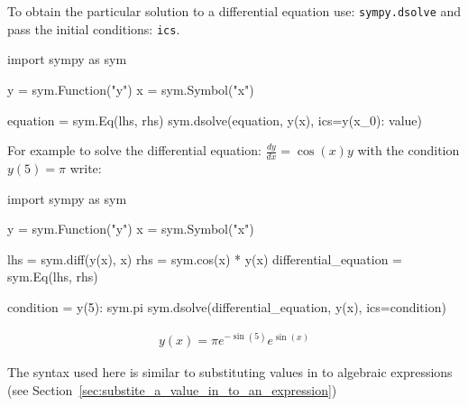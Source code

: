 To obtain the particular solution to a differential equation use:
\texttt{sympy.dsolve} and pass the initial conditions: \texttt{ics}.


\begin{pyin}
import sympy as sym

y = sym.Function("y")
x = sym.Symbol("x")

equation = sym.Eq(lhs, rhs)
sym.dsolve(equation, y(x), ics={y(x_0): value})
\end{pyin}



For example to solve the differential equation: \(\frac{dy}{dx} = \cos(x) y\)
with the condition \(y(5)= \pi\) 
write:




\begin{pyin}
import sympy as sym

y = sym.Function("y")
x = sym.Symbol("x")

lhs = sym.diff(y(x), x)
rhs = sym.cos(x) * y(x)
differential_equation = sym.Eq(lhs, rhs)

condition = {y(5): sym.pi}
sym.dsolve(differential_equation, y(x), ics=condition)
\end{pyin}




\begin{equation*}
\begin{split}\displaystyle y{\left(x \right)} = \pi e^{- \sin{\left(5 \right)}} e^{\sin{\left(x \right)}}\end{split}
\end{equation*}



\begin{note}
The syntax used here is similar to substituting values in to algebraic
expressions (see Section~\ref{sec:substite_a_value_in_to_an_expression})
\end{note}






